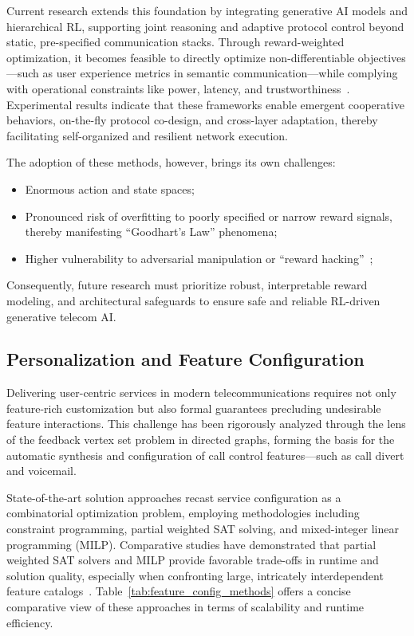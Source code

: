 \documentclass[11pt]{article}
\begin{document}
Current research extends this foundation by integrating generative AI models and hierarchical RL, supporting joint reasoning and adaptive protocol control beyond static, pre-specified communication stacks. Through reward-weighted optimization, it becomes feasible to directly optimize non-differentiable objectives—such as user experience metrics in semantic communication—while complying with operational constraints like power, latency, and trustworthiness~\cite{ref1,ref26,ref36}. Experimental results indicate that these frameworks enable emergent cooperative behaviors, on-the-fly protocol co-design, and cross-layer adaptation, thereby facilitating self-organized and resilient network execution.

The adoption of these methods, however, brings its own challenges:

\begin{itemize}
    \item Enormous action and state spaces;
    \item Pronounced risk of overfitting to poorly specified or narrow reward signals, thereby manifesting ``Goodhart’s Law'' phenomena;
    \item Higher vulnerability to adversarial manipulation or ``reward hacking''~\cite{ref1};
\end{itemize}

Consequently, future research must prioritize robust, interpretable reward modeling, and architectural safeguards to ensure safe and reliable RL-driven generative telecom AI.

\subsection{Personalization and Feature Configuration}

Delivering user-centric services in modern telecommunications requires not only feature-rich customization but also formal guarantees precluding undesirable feature interactions. This challenge has been rigorously analyzed through the lens of the feedback vertex set problem in directed graphs, forming the basis for the automatic synthesis and configuration of call control features—such as call divert and voicemail.

State-of-the-art solution approaches recast service configuration as a combinatorial optimization problem, employing methodologies including constraint programming, partial weighted SAT solving, and mixed-integer linear programming (MILP). Comparative studies have demonstrated that partial weighted SAT solvers and MILP provide favorable trade-offs in runtime and solution quality, especially when confronting large, intricately interdependent feature catalogs~\cite{ref31}. Table~\ref{tab:feature_config_methods} offers a concise comparative view of these approaches in terms of scalability and runtime efficiency.
\end{document}
